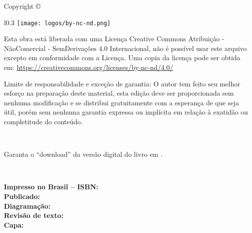 
\newpage
\thispagestyle{empty}

\noindent Copyright \copyright\ \BookEditionYear\ \BookAuthor %

\begin{wrapfigure}{l}{0.3\textwidth}
\vspace{-10pt}
\texttt{[image: logos/by-nc-nd.png]}
\vspace{-10pt}
\end{wrapfigure}
\noindent Esta obra está liberada com uma Licença 
Creative Commons Atribuição - NãoComercial - SemDerivações 4.0 Internacional,
não é possível usar este arquivo excepto em conformidade com a Licença. 
Uma copia da licença pode ser obtida em:
\url{https://creativecommons.org/licenses/by-nc-nd/4.0/} %


\noindent Limite de responsabilidade e exceção de garantia: O autor tem feito
seu melhor esforço na preparação deste material,
esta edição deve ser proporcionada sem nenhuma modificação e
se distribui gratuitamente com a esperança de que seja útil, 
porém sem nenhuma garantia expressa ou implícita em relação à exatidão ou completitude do conteúdo.

~

\noindent Garanta o ``download'' da versão digital do livro em \BookLinkHomePage.

~

\noindent \textbf{Impresso no Brasil -- ISBN:} \BookISBN\\ %
\noindent \textbf{Publicado:} \BookPublisher\\ %
\noindent \textbf{Diagramação:} \BookAuthor\\ %
\noindent \textbf{Revisão de texto:} \BookAuthor\\ %
\noindent \textbf{Capa:} \BookAuthor %

~


\SetBookAuthorLastName{\BookAuthorLastName}
\SetBookAuthorName{\BookAuthorName}
\SetBookAuthorYearBorn{\BookAuthorBorn}
\SetBookTitle{\BookTitle}
\SetBookSubTitle{\BookSubTitle}
\SetBookPublishingPlace{\BookEditionLocal}
\SetBookPublishingEditor{\BookPublisher}
\SetBookPublishingYear{\BookEditionYear}
\SetBookPaperSize{\BookPaperSizeString}
\SetBookHasBibliography{\BookHasBibliography}
\SetBookISBN{\BookISBN}
\SetBookKeyWordA{\BookKeyWordA}
\SetBookKeyWordB{\BookKeyWordB}
\SetBookKeyWordC{\BookKeyWordC}
\SetBookCDD{\BookCDD}
\SetBookCDU{\BookCDU}
{
\centering
\CatalographicCard{12.5cm}
}


